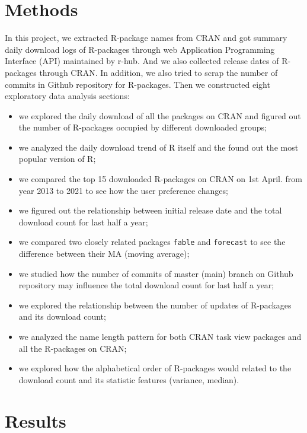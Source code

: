 \documentclass[
]{book}
\begin{document}
\hypertarget{methods}{%
\chapter{Methods}\label{methods}}

In this project, we extracted R-package names from CRAN and got summary daily download logs of R-packages through web Application Programming Interface (API) maintained by r-hub\autocite{rhub}. And we also collected release dates of R-packages through CRAN. In addition, we also tried to scrap the number of commits in Github repository for R-packages. Then we constructed eight exploratory data analysis sections:

\begin{itemize}
\item
  we explored the daily download of all the packages on CRAN and figured out the number of R-packages occupied by different downloaded groups;
\item
  we analyzed the daily download trend of R itself and the found out the most popular version of R;
\item
  we compared the top 15 downloaded R-packages on CRAN on 1st April. from year 2013 to 2021 to see how the user preference changes;
\item
  we figured out the relationship between initial release date and the total download count for last half a year;
\item
  we compared two closely related packages \texttt{fable} and \texttt{forecast} to see the difference between their MA (moving average);
\item
  we studied how the number of commits of master (main) branch on Github repository may influence the total download count for last half a year;
\item
  we explored the relationship between the number of updates of R-packages and its download count;
\item
  we analyzed the name length pattern for both CRAN task view packages and all the R-packages on CRAN;
\item
  we explored how the alphabetical order of R-packages would related to the download count and its statistic features (variance, median).
\end{itemize}

\hypertarget{results}{%
\chapter{Results}\label{results}}
\end{document}
